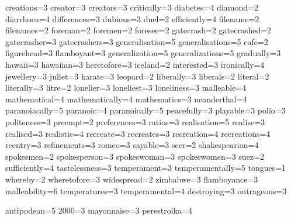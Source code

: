 creations=3 
creator=3 
creators=3 
critically=3 
diabetes=4 
diamond=2 
diarrhoea=4 
differences=3 
dubious=3 
duel=2 
efficiently=4 
filename=2 
filenames=2 
foreman=2 
foremen=2 
foresee=2 
gatecrash=2 
gatecrashed=2 
gatecrasher=3 
gatecrashers=3 
generalisation=5 
generalisations=5 
cafe=2 
figurehead=3 
flamboyant=3 
generalization=5 
generalizations=5 
gradually=3 
hawaii=3 
hawaiian=3 
heretofore=3  
iceland=2 
interested=3 
ironically=4 
jewellery=3 
juliet=3 
karate=3 
leopard=2 
liberally=3 
liberals=2 
literal=2 
literally=3 
litre=2 
lonelier=3 
loneliest=3 
loneliness=3 
malleable=4 
mathematical=4 
mathematically=4 
mathematics=3 
neanderthal=4 
paranoiacally=5 
paranoic=4 
paranoically=5 
peacefully=3 
playable=3 
polio=3 
politeness=3 
preempt=2 
preferences=3   
ratios=3 
realisation=5 
realise=3 
realised=3 
realistic=4 
recreate=3 
recreates=3 
recreation=4 
recreations=4 
reentry=3 
refinements=3 
romeo=3 
sayable=3 
seer=2 
shakespearian=4 
spokesmen=2 
spokesperson=3 
spokeswoman=3 
spokeswomen=3 
suez=2 
sufficiently=4 
tastelessness=3 
temperament=3 
temperamentally=5 
tongues=1 
whereby=2 
wheretofore=3 
widespread=2 
zimbabwe=3 
flamboyance=3 
malleability=6 
temperatures=3 
temperamental=4 
destroying=3 
outrageous=3 

antipodean=5 
2000=3 
mayonnaise=3 
perestroika=4

